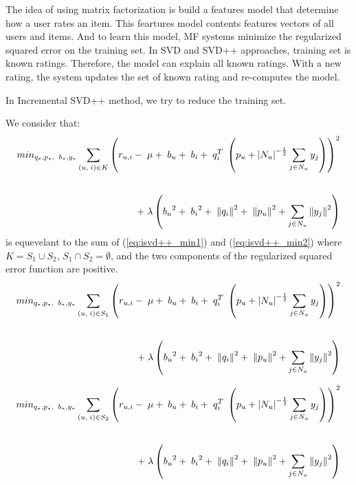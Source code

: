 \documentclass[oneside,13pt]{extreport}
\begin{document}
The idea of using matrix factorization is build a features model that determine how a user rates an item. This feartures model contents features vectors of all users and items. And to learn this model, MF systems minimize the regularized squared error on the training set. In SVD and SVD++ approaches, training set is known ratings. Therefore, the model can explain all known ratings. With a new rating, the system updates the set of known rating and re-computes the model. 

In Incremental SVD++ method, we try to reduce the training set. 

We consider that: 
\begin{eqnarray}
\label{eq:isvd++_min}
\begin{aligned}
mi{n_{{q_*},{p_*},\;\;{b_*},{y_*}}}\mathop \sum \limits_{\left( {u,\;i} \right) \in K} {\left( {{r_{u,i}} - \;\mu  + \;{b_u} + \;{b_i} + \;q_i^T\;\left( {{p_u} + {{\left| {{N_u}} \right|}^{ - \frac{1}{2}}}\sum\limits_{j  \in {N_u}} {{y_j}} } \right)} \right)^2} \\[\jot]\\+ \;\lambda \left( {{b_u}^2 + \;{b_i}^2 + \;{{\left\| {{q_i}} \right\|}^2} + \;{{\left\| {{p_u}} \right\|}^2} + \sum\limits_{j \in {N_u}} {{{\left\| {{y_j}} \right\|}^2}} } \right)
\end{aligned}
\end{eqnarray}
is equevelant to the sum of (\ref{eq:isvd++_min1}) and (\ref{eq:isvd++_min2}) where $K= S_1 \cup S_2$, $S_1 \cap S_2 = \emptyset$, and the two components of the regularized squared error function are positive.
\begin{eqnarray}
\label{eq:isvd++_min1}
\begin{aligned}
mi{n_{{q_*},{p_*},\;\;{b_*},{y_*}}}\mathop \sum \limits_{\left( {u,\;i} \right) \in S_1} {\left( {{r_{u,i}} - \;\mu  + \;{b_u} + \;{b_i} + \;q_i^T\;\left( {{p_u} + {{\left| {{N_u}} \right|}^{ - \frac{1}{2}}}\sum\limits_{j  \in {N_u}} {{y_j}} } \right)} \right)^2} \\[\jot]\\+ \;\lambda \left( {{b_u}^2 + \;{b_i}^2 + \;{{\left\| {{q_i}} \right\|}^2} + \;{{\left\| {{p_u}} \right\|}^2} + \sum\limits_{j \in {N_u}} {{{\left\| {{y_j}} \right\|}^2}} } \right)
\end{aligned}
\end{eqnarray}

\begin{eqnarray}
\label{eq:isvd++_min2}
\begin{aligned}
mi{n_{{q_*},{p_*},\;\;{b_*},{y_*}}}\mathop \sum \limits_{\left( {u,\;i} \right) \in S_2} {\left( {{r_{u,i}} - \;\mu  + \;{b_u} + \;{b_i} + \;q_i^T\;\left( {{p_u} + {{\left| {{N_u}} \right|}^{ - \frac{1}{2}}}\sum\limits_{j  \in {N_u}} {{y_j}} } \right)} \right)^2} \\[\jot]\\+ \;\lambda \left( {{b_u}^2 + \;{b_i}^2 + \;{{\left\| {{q_i}} \right\|}^2} + \;{{\left\| {{p_u}} \right\|}^2} + \sum\limits_{j \in {N_u}} {{{\left\| {{y_j}} \right\|}^2}} } \right)
\end{aligned}
\end{eqnarray}
\end{document}
